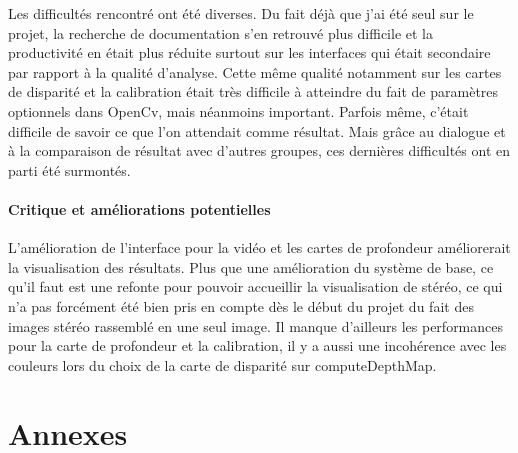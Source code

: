 \documentclass{article}
\begin{document}
Les difficultés rencontré ont été diverses. Du fait déjà que j'ai été seul sur le projet, la recherche de documentation s'en retrouvé plus difficile et la productivité en était plus réduite surtout sur les interfaces qui était secondaire par rapport à la qualité d'analyse. Cette même qualité notamment sur les cartes de disparité et la calibration était très difficile à atteindre du fait de paramètres optionnels dans OpenCv, mais néanmoins important. Parfois même, c'était difficile de savoir ce que l'on attendait comme résultat. Mais grâce au dialogue et à la comparaison de résultat avec d'autres groupes, ces dernières difficultés ont en parti été surmontés.

\subsection{Critique et améliorations potentielles}

L'amélioration de l'interface pour la vidéo et les cartes de profondeur améliorerait la visualisation des résultats. Plus que une amélioration du système de base, ce qu'il faut est une refonte pour pouvoir accueillir la visualisation de stéréo, ce qui n'a pas forcément été bien pris en compte dès le début du projet du fait des images stéréo rassemblé en une seul image.
Il manque d'ailleurs les performances pour la carte de profondeur et la calibration, il y a aussi une incohérence avec les couleurs lors du choix de la carte de disparité sur computeDepthMap.

\newpage
\appendix
\part{Annexes}

\listoffigures
\end{document}
